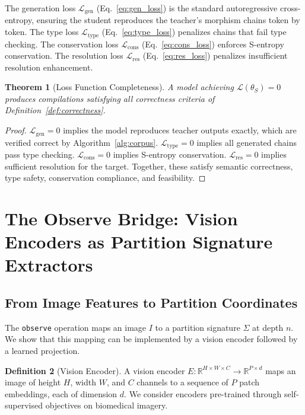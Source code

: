 \documentclass[11pt,twocolumn,a4paper]{article}
\newtheorem{theorem}{Theorem}[section]
\theoremstyle{definition}
\newtheorem{definition}[theorem]{Definition}
\theoremstyle{remark}
\newcommand{\Sig}{\Sigma}
\newcommand{\R}{\mathbb{R}}
\newcommand{\loss}{\mathcal{L}}
\newcommand{\params}{\theta}
\begin{document}
The generation loss $\loss_{\text{gen}}$ (Eq.~\ref{eq:gen_loss}) is the standard autoregressive cross-entropy, ensuring the student reproduces the teacher's morphism chains token by token. The type loss $\loss_{\text{type}}$ (Eq.~\ref{eq:type_loss}) penalizes chains that fail type checking. The conservation loss $\loss_{\text{cons}}$ (Eq.~\ref{eq:cons_loss}) enforces S-entropy conservation. The resolution loss $\loss_{\text{res}}$ (Eq.~\ref{eq:res_loss}) penalizes insufficient resolution enhancement.

\begin{theorem}[Loss Function Completeness]
\label{thm:loss_complete}
A model achieving $\loss(\params_S) = 0$ produces compilations satisfying all correctness criteria of Definition~\ref{def:correctness}.
\end{theorem}

\begin{proof}
$\loss_{\text{gen}} = 0$ implies the model reproduces teacher outputs exactly, which are verified correct by Algorithm~\ref{alg:corpus}. $\loss_{\text{type}} = 0$ implies all generated chains pass type checking. $\loss_{\text{cons}} = 0$ implies S-entropy conservation. $\loss_{\text{res}} = 0$ implies sufficient resolution for the target. Together, these satisfy semantic correctness, type safety, conservation compliance, and feasibility.
\end{proof}

\section{The Observe Bridge: Vision Encoders as Partition Signature Extractors}
\label{sec:observe}

\subsection{From Image Features to Partition Coordinates}

The \texttt{observe} operation maps an image $I$ to a partition signature $\Sig$ at depth $n$. We show that this mapping can be implemented by a vision encoder followed by a learned projection.

\begin{definition}[Vision Encoder]
\label{def:encoder}
A vision encoder $E: \R^{H \times W \times C} \to \R^{P \times d}$ maps an image of height $H$, width $W$, and $C$ channels to a sequence of $P$ patch embeddings, each of dimension $d$. We consider encoders pre-trained through self-supervised objectives on biomedical imagery.
\end{definition}
\end{document}
